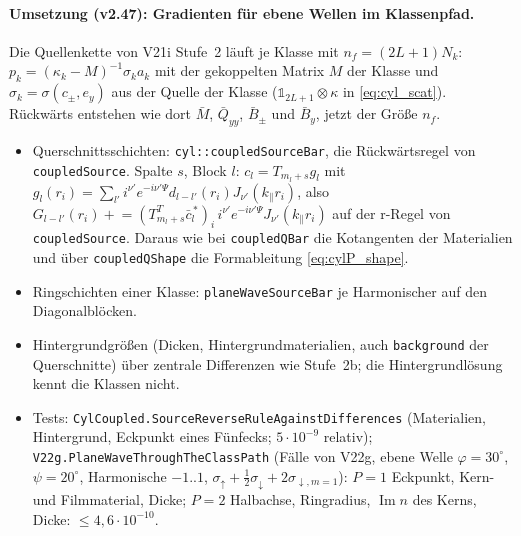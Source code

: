 \paragraph{Umsetzung (v2.47): Gradienten für ebene Wellen im Klassenpfad.}
Die Quellenkette von V21i Stufe~2 läuft je Klasse mit $n_f=(2L+1)N_k$: $p_k=(\kappa_k-M)^{-1}\sigma_k a_k$ mit der
gekoppelten Matrix $M$ der Klasse und $\sigma_k=\sigma(c_\pm,e_y)$ aus der Quelle der Klasse ($\mathbb 1_{2L+1}\otimes\kappa$ in
\eqref{eq:cyl_scat}). Rückwärts entstehen wie dort $\bar M$, $\bar Q_{yy}$, $\bar B_\pm$ und $\bar B_y$, jetzt der Größe $n_f$.
\begin{itemize}[nosep]
  \item Querschnittsschichten: \verb|cyl::coupledSourceBar|, die Rückwärtsregel von \verb|coupledSource|. Spalte $s$,
        Block $l$: $c_l=T_{m_l+s}g_l$ mit $g_l(r_i)=\sum_{l'}i^{\nu'}e^{-i\nu'\Psi}d_{l-l'}(r_i)J_{\nu'}(k_\parallel r_i)$, also
        $G_{l-l'}(r_i)\mathrel{+}=(T_{m_l+s}^T\bar c_l^{\,*})_i\,i^{\nu'}e^{-i\nu'\Psi}J_{\nu'}(k_\parallel r_i)$ auf der r-Regel von
        \verb|coupledSource|. Daraus wie bei \verb|coupledQBar| die Kotangenten der Materialien und über
        \verb|coupledQShape| die Formableitung \eqref{eq:cylP_shape}.
  \item Ringschichten einer Klasse: \verb|planeWaveSourceBar| je Harmonischer auf den Diagonalblöcken.
  \item Hintergrundgrößen (Dicken, Hintergrundmaterialien, auch \verb|background| der Querschnitte) über zentrale
        Differenzen wie Stufe~2b; die Hintergrundlösung kennt die Klassen nicht.
  \item Tests: \verb|CylCoupled.SourceReverseRuleAgainstDifferences| (Materialien, Hintergrund, Eckpunkt eines Fünfecks;
        $5\cdot10^{-9}$ relativ); \verb|V22g.PlaneWaveThroughTheClassPath| (Fälle von V22g, ebene Welle $\varphi=30^\circ$,
        $\psi=20^\circ$, Harmonische $-1..1$, $\sigma_\uparrow+\tfrac12\sigma_\downarrow+2\sigma_{\downarrow,m=1}$): $P=1$ Eckpunkt,
        Kern- und Filmmaterial, Dicke; $P=2$ Halbachse, Ringradius, $\operatorname{Im}n$ des Kerns, Dicke: $\le4{,}6\cdot10^{-10}$.
\end{itemize}

